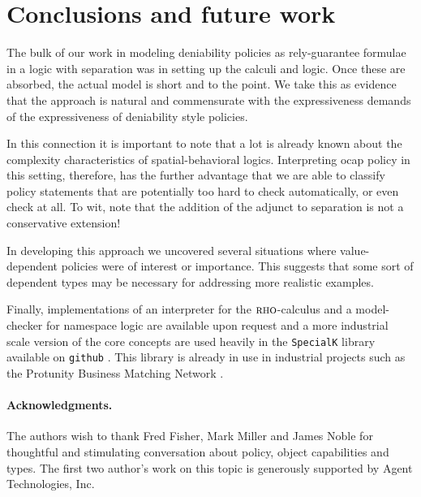 \documentclass[]{acm_proc_article-sp}
\numberwithin{equation}{subsection}
\newcommand{\rhoc}{${\textsc{rho}}$-calculus}
\begin{document}
\section{Conclusions and future work}

The bulk of our work in modeling deniability policies as
rely-guarantee formulae in a logic with separation was in setting up
the calculi and logic. Once these are absorbed, the actual model is
short and to the point. We take this as evidence that the approach is
natural and commensurate with the expressiveness demands of the
expressiveness of deniability style policies.

In this connection it is important to note that a lot is already known
about the complexity characteristics of spatial-behavioral
logics. Interpreting ocap policy in this setting, therefore, has the
further advantage that we are able to classify policy statements that
are potentially too hard to check automatically, or even check at
all. To wit, \cite{Caires04eliminationof} note that the addition of
the adjunct to separation is not a conservative extension!

In developing this approach we uncovered several situations where
value-dependent policies were of interest or importance. This suggests
that some sort of dependent types may be necessary for addressing more
realistic examples.

Finally, implementations of an interpreter for the {\rhoc} and a
model-checker for namespace logic are available upon request and a
more industrial scale version of the core concepts are used heavily in
the \texttt{SpecialK} library available on \texttt{github}
\cite{SpecialK}. This library is already in use in industrial projects
such as the Protunity Business Matching Network \cite{Protunity}.

\paragraph{Acknowledgments.}
The authors wish to thank Fred Fisher, Mark Miller and James Noble for thoughtful
and stimulating conversation about policy, object capabilities and
types. The first two author's work on this topic is generously supported
by Agent Technologies, Inc.



\end{document}
